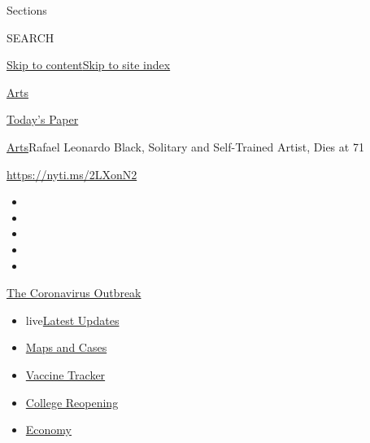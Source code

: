 Sections

SEARCH

\protect\hyperlink{site-content}{Skip to
content}\protect\hyperlink{site-index}{Skip to site index}

\href{https://www.nytimes.com/section/arts}{Arts}

\href{https://myaccount.nytimes.com/auth/login?response_type=cookie\&client_id=vi}{}

\href{https://www.nytimes.com/section/todayspaper}{Today's Paper}

\href{/section/arts}{Arts}\textbar{}Rafael Leonardo Black, Solitary and
Self-Trained Artist, Dies at 71

\url{https://nyti.ms/2LXonN2}

\begin{itemize}
\item
\item
\item
\item
\item
\end{itemize}

\href{https://www.nytimes.com/news-event/coronavirus?action=click\&pgtype=Article\&state=default\&region=TOP_BANNER\&context=storylines_menu}{The
Coronavirus Outbreak}

\begin{itemize}
\tightlist
\item
  live\href{https://www.nytimes.com/2020/08/03/world/coronavirus-covid-19.html?action=click\&pgtype=Article\&state=default\&region=TOP_BANNER\&context=storylines_menu}{Latest
  Updates}
\item
  \href{https://www.nytimes.com/interactive/2020/us/coronavirus-us-cases.html?action=click\&pgtype=Article\&state=default\&region=TOP_BANNER\&context=storylines_menu}{Maps
  and Cases}
\item
  \href{https://www.nytimes.com/interactive/2020/science/coronavirus-vaccine-tracker.html?action=click\&pgtype=Article\&state=default\&region=TOP_BANNER\&context=storylines_menu}{Vaccine
  Tracker}
\item
  \href{https://www.nytimes.com/2020/08/02/us/covid-college-reopening.html?action=click\&pgtype=Article\&state=default\&region=TOP_BANNER\&context=storylines_menu}{College
  Reopening}
\item
  \href{https://www.nytimes.com/live/2020/08/03/business/stock-market-today-coronavirus?action=click\&pgtype=Article\&state=default\&region=TOP_BANNER\&context=storylines_menu}{Economy}
\end{itemize}

